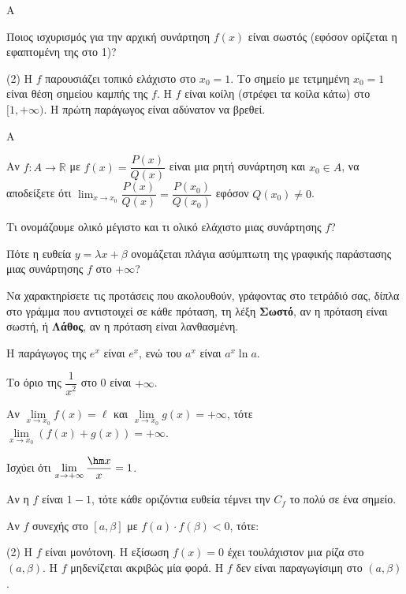 \begin{thema}{A}
\begin{erwthma}
\begin{center}
\begin{tikzpicture}
    \end{tikzpicture}
    \end{center}
    Ποιος ισχυρισμός για την αρχική συνάρτηση $f(x)$ είναι σωστός (εφόσον ορίζεται η εφαπτομένη της στο 1)?
    \begin{tasks}[label=\let\textdexiakeraia\relax\alph*.](2)
        \task Η $f$ παρουσιάζει τοπικό ελάχιστο στο $x_0 = 1$.
        \task Το σημείο με τετμημένη $x_0 = 1$ είναι θέση σημείου καμπής της $f$.
        \task Η $f$ είναι κοίλη (στρέφει τα κοίλα κάτω) στο $[1, +\infty)$.
        \task Η πρώτη παράγωγος είναι αδύνατον να βρεθεί.
    \end{tasks}
\end{erwthma}
\end{thema}


\begin{thema}{A}
\begin{erwthma}
    \item Αν $ f:A\to\mathbb{R} $ με $ f(x)=\dfrac{P(x)}{Q(x)} $ είναι μια ρητή συνάρτηση και $ x_0\in A $, να αποδείξετε ότι $ {\displaystyle{\lim_{x\to x_0}{\dfrac{P(x)}{Q(x)}}=\dfrac{P(x_0)}{Q(x_0)}}} $ εφόσον $ Q(x_0)\neq0 $.
    \item Τι ονομάζουμε ολικό μέγιστο και τι ολικό ελάχιστο μιας συνάρτησης $f$?
    \item Πότε η ευθεία $y=\lambda x+\beta$ ονομάζεται πλάγια ασύμπτωτη της γραφικής παράστασης μιας συνάρτησης $f$ στο $+\infty$?
    \item Να χαρακτηρίσετε τις προτάσεις που ακολουθούν, γράφοντας στο τετράδιό σας, δίπλα στο γράμμα που αντιστοιχεί σε κάθε πρόταση, τη λέξη \textbf{Σωστό}, αν η πρόταση είναι σωστή, ή \textbf{Λάθος}, αν η πρόταση είναι λανθασμένη.
    \begin{alist}
        \item Η παράγωγος της $e^x$ είναι $e^x$, ενώ του $a^x$ είναι $a^x \ln a$.
        \item Το όριο της $\dfrac{1}{x^2}$ στο 0 είναι $+\infty$.
        \item Αν $\lim\limits_{x\to x_0} f(x) = \ell$ και $\lim\limits_{x\to x_0} g(x) = +\infty$, τότε $\lim\limits_{x\to x_0} (f(x)+g(x)) = +\infty$.
        \item Ισχύει ότι $\lim\limits_{x \to +\infty} \dfrac{\hm x}{x} = 1$.
        \item Αν η $f$ είναι $1-1$, τότε κάθε οριζόντια ευθεία τέμνει την $C_f$ το πολύ σε ένα σημείο.
    \end{alist}
    \item Αν $f$ συνεχής στο $[a,\beta]$ με $f(a) \cdot f(\beta) < 0$, τότε:
    \begin{tasks}[label=\let\textdexiakeraia\relax\alph*.](2)
        \task Η $f$ είναι μονότονη.
        \task Η εξίσωση $f(x) = 0$ έχει τουλάχιστον μια ρίζα στο $(a,\beta)$.
        \task Η $f$ μηδενίζεται ακριβώς μία φορά.
        \task Η $f$ δεν είναι παραγωγίσιμη στο $(a,\beta)$.
    \end{tasks}
\end{erwthma}
\end{thema}



